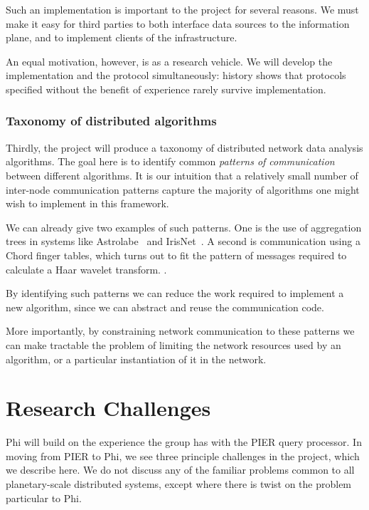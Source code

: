 \documentclass[twocolumn,10pt]{article}
\newcommand{\note}[1]{}
\def\Lrp{Phi\xspace}
\begin{document}
Such an implementation is important to the project for several
reasons.  We must make it easy for third parties to both interface
data sources to the information plane, and to implement clients of the
infrastructure.  

An equal motivation, however, is as a research vehicle.  We will
develop the implementation and the protocol simultaneously: history
shows that protocols specified without the benefit of experience
rarely survive implementation.

\subsubsection*{Taxonomy of distributed algorithms}

Thirdly, the project will produce a taxonomy of distributed
network data analysis algorithms.  The goal here is to identify
common \emph{patterns of communication} between different algorithms.
It is our intuition that a relatively small number of inter-node
communication patterns capture the majority of algorithms one might
wish to implement in this framework.  

We can already give two examples of such patterns.  One is the use of
aggregation trees in systems like Astrolabe~\cite{astrolabe} and
IrisNet~\cite{Gibbons2003}.  A second is 
communication using a Chord finger tables, which turns out to
fit the pattern of messages required to calculate a Haar wavelet
transform. \note{Joe, can you give a reference for this?  Actually, I'd
  like to read it myself -- Mothy}.

By identifying such patterns we can reduce the work required to
implement a new algorithm, since we can abstract and reuse the
communication code.  

More importantly, by constraining network communication to these
patterns we can make tractable the problem of limiting the network
resources used by an algorithm, or a particular instantiation of it in
the network.

\section{Research Challenges}

\Lrp will build on the experience the group has with the PIER query
processor.  In moving from PIER to \Lrp, we see three principle
challenges in the project, which we describe here.  We do not discuss
any of the familiar problems common to all planetary-scale distributed
systems, except where there is twist on the problem particular to \Lrp.
\end{document}
